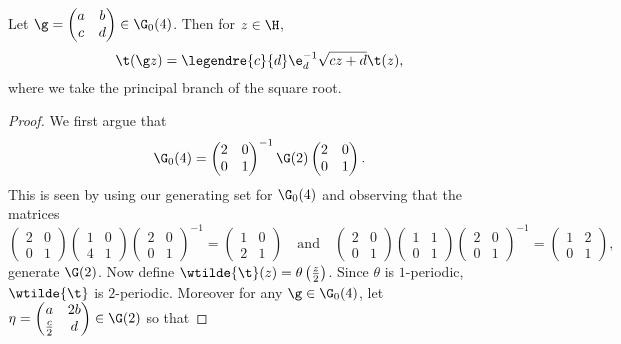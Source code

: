       \begin{proposition}
        Let $\g = \begin{pmatrix} a & b \\ c & d \end{pmatrix} \in \G_{0}(4)$. Then for $z \in \H$,
        \[
          \t(\g z) = \legendre{c}{d}\e_{d}^{-1}\sqrt{cz+d}\t(z),
        \]
        where we take the principal branch of the square root.
      \end{proposition}
      \begin{proof}
        We first argue that
        \[
          \G_{0}(4) = \begin{pmatrix} 2 & 0 \\ 0 & 1 \end{pmatrix}^{-1} \G(2) \begin{pmatrix} 2 & 0 \\ 0 & 1 \end{pmatrix}.
        \]
        This is seen by using our generating set for $\G_{0}(4)$ and observing that the matrices
        \[
          \begin{pmatrix} 2 & 0 \\ 0 & 1 \end{pmatrix} \begin{pmatrix} 1 & 0 \\ 4 & 1 \end{pmatrix} \begin{pmatrix} 2 & 0 \\ 0 & 1 \end{pmatrix}^{-1} = \begin{pmatrix} 1 & 0 \\ 2 & 1 \end{pmatrix} \quad \text{and} \quad \begin{pmatrix} 2 & 0 \\ 0 & 1 \end{pmatrix} \begin{pmatrix} 1 & 1 \\ 0 & 1 \end{pmatrix} \begin{pmatrix} 2 & 0 \\ 0 & 1 \end{pmatrix}^{-1} = \begin{pmatrix} 1 & 2 \\ 0 & 1 \end{pmatrix},
        \]
        generate $\G(2)$. Now define $\wtilde{\t}(z) = \theta\left(\frac{z}{2}\right)$. Since $\theta$ is $1$-periodic, $\wtilde{\t}$ is $2$-periodic. Moreover for any $\g \in \G_{0}(4)$, let $\eta = \begin{pmatrix} a & 2b \\ \frac{c}{2} & d\end{pmatrix} \in \G(2)$ so that

\end{proof}
